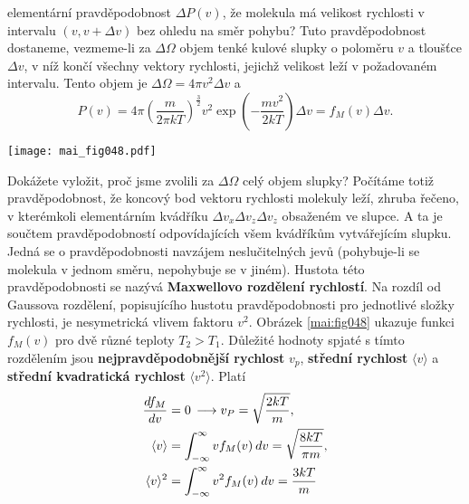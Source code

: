 \begin{example}
  elementární pravděpodobnost \(\Delta P(v)\), že molekula má velikost rychlosti v intervalu \((v, 
  v + \Delta v)\) bez ohledu na směr pohybu? Tuto pravděpodobnost dostaneme, vezmeme-li za 
  \(\Delta\Omega\) objem tenké kulové slupky o poloměru \(v\) a tloušťce \(\Delta v\), v níž končí 
  všechny vektory rychlosti, jejichž velikost leží v požadovaném intervalu. Tento objem je 
  \(\Delta\Omega = 4\pi v^2\Delta v\) a
  \begin{equation*}
    P(v) = 4\pi\left(\dfrac{m}{2\pi kT}\right)^{\frac{3}{2}}v^2
               \exp\left(- \dfrac{mv^2}{2 kT}\right)\Delta v = f_M(v)\Delta v. 
  \end{equation*}

  {\centering
   \captionsetup{type=figure}
   \texttt{[image: mai\_fig048.pdf]}
  \par}
  
  Dokážete vyložit, proč jsme zvolili za \(\Delta\Omega\) celý objem slupky? Počítáme totiž 
  pravděpodobnost, že koncový bod vektoru rychlosti molekuly leží, zhruba řečeno, v kterémkoli 
  elementárním kvádříku \(\Delta v_x\Delta v_z\Delta v_z\) obsaženém ve slupce. A ta je součtem 
  pravděpodobností odpovídajících všem kvádříkům vytvářejícím slupku. Jedná se o pravděpodobnosti 
  navzájem neslučitelných jevů (pohybuje-li se molekula v jednom směru, nepohybuje se v jiném). 
  Hustota této pravděpodobnosti se nazývá \textbf{Maxwellovo rozdělení rychlostí}. Na rozdíl od 
  Gaussova rozdělení, popisujícího hustotu pravděpodobnosti pro jednotlivé složky rychlosti, je 
  nesymetrická vlivem faktoru \(v^2\). Obrázek \ref{mai:fig048} ukazuje funkci \(f_M(v)\) pro dvě 
  různé teploty \(T_2 > T_1\). Důležité hodnoty spjaté s tímto rozdělením jsou 
  \textbf{nejpravděpodobnější rychlost} \(v_p\), \textbf{střední rychlost} \(\langle v \rangle\) a 
  \textbf{střední kvadratická rychlost} \(\langle v^2 \rangle\). Platí
  \begin{align*}
    \dfrac{d f_M}{d v}        &= 0\, \longrightarrow v_P = \sqrt{\dfrac{2kT}{m}},                      \\
    \langle v \rangle   &= \int_{-\infty}^{\infty}vf_M(v)\hspace{2pt}dv = \sqrt{\dfrac{8kT}{\pi m}},     \\
    \langle v \rangle^2 &= \int_{-\infty}^{\infty}v^2f_M(v)\hspace{2pt}dv = \dfrac{3kT}{m}
  \end{align*}
\normalsize
\end{example}